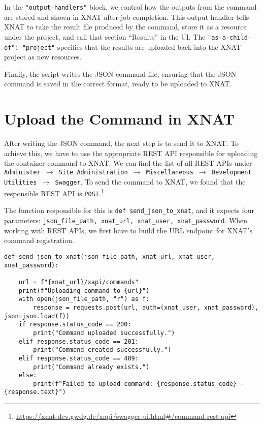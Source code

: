 In the \texttt{"output-handlers"} block, we control how the outputs from the command are stored and shown in XNAT after job completion. This output handler tells XNAT to take the result file produced by the command, store it as a resource under the project, and call that section ``Results'' in the UI. The \texttt{"as-a-child-of": "project"} specifies that the results are uploaded back into the XNAT project as new resources.

Finally, the script writes the JSON command file, ensuring that the JSON command is saved in the correct format, ready to be uploaded to XNAT.

\section{Upload the Command in XNAT}

After writing the JSON command, the next step is to send it to XNAT. To achieve this, we have to use the appropriate REST API responsible for uploading the container command to XNAT.
We can find the list of all REST APIs under \texttt{Administer $\rightarrow$ Site Administration $\rightarrow$ Miscellaneous $\rightarrow$ Development Utilities $\rightarrow$ Swagger}.
To send the command to XNAT, we found that the responsible REST API is \texttt{POST}.\footnote{\url{https://xnat-dev.gwdg.de/xapi/swagger-ui.html\#/command-rest-api}}

The function responsible for this is \texttt{def send\_json\_to\_xnat}, and it expects four parameters: \texttt{json\_file\_path, xnat\_url, xnat\_user, xnat\_password}. When working with REST APIs, we first have to build the URL endpoint for XNAT’s command registration.
 
\begin{lstlisting}
def send_json_to_xnat(json_file_path, xnat_url, xnat_user, xnat_password): 

    url = f"{xnat_url}/xapi/commands"
    print(f"Uploading command to {url}")
    with open(json_file_path, "r") as f:
        response = requests.post(url, auth=(xnat_user, xnat_password), json=json.load(f))
    if response.status_code == 200:
        print("Command uploaded successfully.")
    elif response.status_code == 201:
        print("Command created successfully.")
    elif response.status_code == 409:
        print("Command already exists.")
    else:
        print(f"Failed to upload command: {response.status_code} - {response.text}")
\end{lstlisting}

